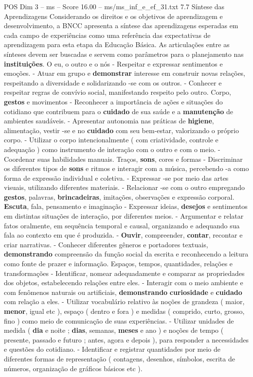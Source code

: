 \begin{textsample}{POS Dim 3 – ms – Score 16.00 – ms/ms\_inf\_e\_ef\_31.txt}  \label{ex:f3_pos_195}
7.7 Síntese das Aprendizagens Considerando os direitos e os objetivos de aprendizagem e desenvolvimento, a BNCC apresenta a síntese das aprendizagens esperadas em cada campo de experiências como uma referência das expectativas de aprendizagem para esta etapa da Educação Básica.
As articulações entre as sínteses devem ser buscadas e servem como parâmetros para o planejamento nas \textbf{instituições}.
O eu, o outro e o nós - Respeitar e expressar sentimentos e emoções. - Atuar em grupo e \textbf{demonstrar} interesse em construir novas relações, respeitando a diversidade e solidarizando -se com os outros. - Conhecer e respeitar regras de convívio social, manifestando respeito pelo outro.
Corpo, \textbf{gestos} e movimentos - Reconhecer a importância de ações e situações do cotidiano que contribuem para o \textbf{cuidado} de sua saúde e a \textbf{manutenção} de ambientes saudáveis. - Apresentar autonomia nas práticas de \textbf{higiene}, alimentação, vestir -se e no \textbf{cuidado} com seu bem-estar, valorizando o próprio corpo. - Utilizar o corpo intencionalmente ( com criatividade, controle e adequação ) como instrumento de interação com o outro e com o meio. - Coordenar suas habilidades manuais.
Traços, \textbf{sons}, cores e formas - Discriminar os diferentes tipos de \textbf{sons} e ritmos e interagir com a música, percebendo -a como forma de expressão individual e coletiva. - Expressar -se por meio das artes visuais, utilizando diferentes materiais. - Relacionar -se com o outro empregando \textbf{gestos}, palavras, \textbf{brincadeiras}, imitações, observações e expressão corporal. \textbf{Escuta}, fala, pensamento e imaginação - Expressar ideias, \textbf{desejos} e sentimentos em distintas situações de interação, por diferentes meios. - Argumentar e relatar fatos oralmente, em sequência temporal e causal, organizando e adequando sua fala ao contexto em que é produzida. - \textbf{Ouvir}, compreender, \textbf{contar}, recontar e criar narrativas. - Conhecer diferentes gêneros e portadores textuais, \textbf{demonstrando} compreensão da função social da escrita e reconhecendo a leitura como fonte de prazer e informação.
Espaços, tempos, quantidades, relações e transformações - Identificar, nomear adequadamente e comparar as propriedades dos objetos, estabelecendo relações entre eles. - Interagir com o meio ambiente e com fenômenos naturais ou artificiais, \textbf{demonstrando} \textbf{curiosidade} e \textbf{cuidado} com relação a eles. - Utilizar vocabulário relativo às noções de grandeza ( maior, \textbf{menor}, igual etc ), espaço ( dentro e fora ) e medidas ( comprido, curto, grosso, fino ) como meio de comunicação de suas experiências. - Utilizar unidades de medida ( \textbf{dia} e noite ; \textbf{dias}, semanas, \textbf{meses} e ano ) e noções de tempo ( presente, passado e futuro ; antes, agora e depois ), para responder a necessidades e questões do cotidiano. - Identificar e registrar quantidades por meio de diferentes formas de representação ( contagens, desenhos, símbolos, escrita de números, organização de gráficos básicos etc ).

\end{textsample}
